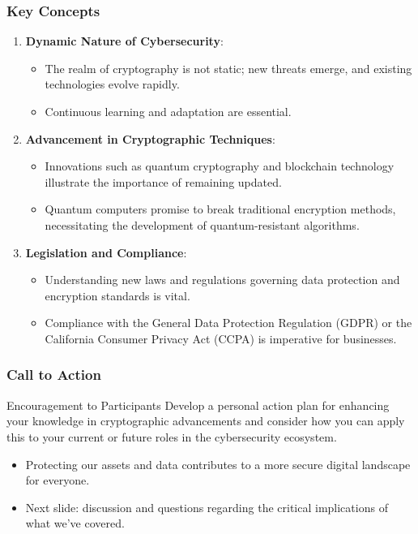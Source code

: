 \documentclass{beamer}
\begin{document}
\begin{frame}[fragile]
    \frametitle{Key Concepts}
    \begin{enumerate}
        \item \textbf{Dynamic Nature of Cybersecurity}:
        \begin{itemize}
            \item The realm of cryptography is not static; new threats emerge, and existing technologies evolve rapidly.
            \item Continuous learning and adaptation are essential.
        \end{itemize}
    
        \item \textbf{Advancement in Cryptographic Techniques}:
        \begin{itemize}
            \item Innovations such as quantum cryptography and blockchain technology illustrate the importance of remaining updated.
            \item Quantum computers promise to break traditional encryption methods, necessitating the development of quantum-resistant algorithms.
        \end{itemize}
    
        \item \textbf{Legislation and Compliance}:
        \begin{itemize}
            \item Understanding new laws and regulations governing data protection and encryption standards is vital.
            \item Compliance with the General Data Protection Regulation (GDPR) or the California Consumer Privacy Act (CCPA) is imperative for businesses.
        \end{itemize}
    \end{enumerate}
\end{frame}

\begin{frame}[fragile]
    \frametitle{Call to Action}
    \begin{block}{Encouragement to Participants}
        Develop a personal action plan for enhancing your knowledge in cryptographic advancements and consider how you can apply this to your current or future roles in the cybersecurity ecosystem.
    \end{block}
    
    \begin{itemize}
        \item Protecting our assets and data contributes to a more secure digital landscape for everyone.
        \item Next slide: discussion and questions regarding the critical implications of what we've covered.
    \end{itemize}
\end{frame}
\end{document}
